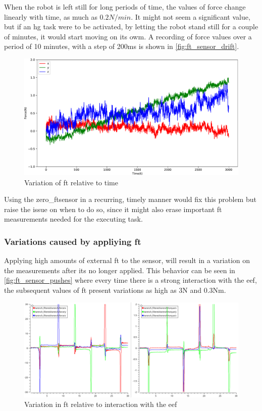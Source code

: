 \par When the robot is left still for long periods of time, the values of force change linearly with time, as much as $0.2\si{N}/\si{min}$. It might not seem a significant value, but if an \ac{hg} task were to be activated, by letting the robot stand still for a couple of minutes, it would start moving on its owm. A recording of force values over a period of 10 minutes, with a step of 200ms is shown in \autoref{fig:ft_sensor_drift}. 

\begin{figure}[h]
    \centering
    \includegraphics[width=0.8\linewidth]{figs/chp3/ft_sensor_drift.pdf}
    \caption{Variation of \ac{ft} relative to time}
    \label{fig:ft_sensor_drift}
\end{figure}

\par Using the zero\_ftsensor in a recurring, timely manner would fix this problem but raise the issue on when to do so, since it might also erase important \ac{ft} measurements needed for the executing task.

\subsubsection{Variations caused by appliying \ac{ft}}

\par Applying high amounts of external \ac{ft} to the sensor, will result in a variation on the measurements after its no longer applied. This behavior can be seen in \autoref{fig:ft_sensor_pushes} where every time there is a strong interaction with the \ac{eef}, the subsequent values of \ac{ft} present variations as high as 3N and 0.3Nm.

\begin{figure}[h]
    \centering
    \includegraphics[width=0.9\linewidth]{figs/chp3/ft_sensor_pushes.png}
    \caption{Variation in \ac{ft} relative to interaction with the \ac{eef}}
    \label{fig:ft_sensor_pushes}
\end{figure}

